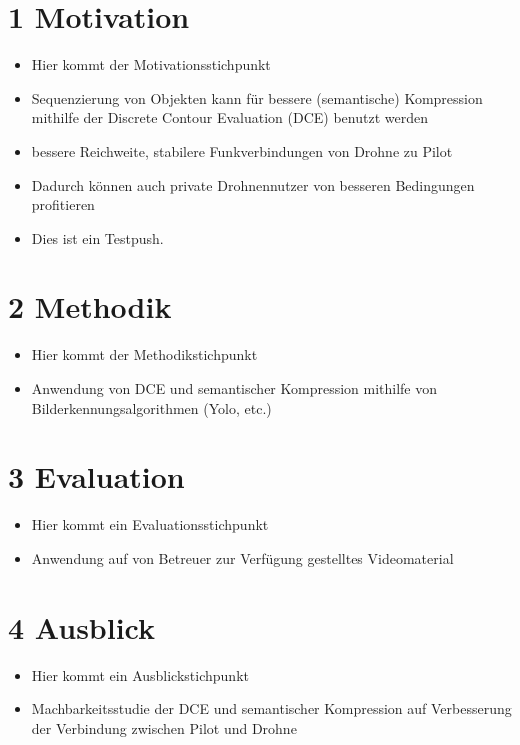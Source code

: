 \documentclass[a4paper,11pt,pdftex]{scrreport}
\begin{document}
\section*{1 Motivation}
\begin{itemize}
    \item Hier kommt der Motivationsstichpunkt
    \item Sequenzierung von Objekten kann für bessere (semantische) Kompression mithilfe der Discrete Contour Evaluation (DCE) benutzt werden
    \item bessere Reichweite, stabilere Funkverbindungen von Drohne zu Pilot
    \item Dadurch können auch private Drohnennutzer von besseren Bedingungen profitieren
    \item Dies ist ein Testpush.
\end{itemize}


\section*{2 Methodik}
\begin{itemize}
    \item Hier kommt der Methodikstichpunkt
    \item Anwendung von DCE und semantischer Kompression mithilfe von Bilderkennungsalgorithmen (Yolo, etc.)
    

\end{itemize}



\section*{3 Evaluation}
\begin{itemize}
    \item Hier kommt ein Evaluationsstichpunkt
    \item Anwendung auf von Betreuer zur Verfügung gestelltes Videomaterial
\end{itemize}


\section*{4 Ausblick}
\begin{itemize}
    \item Hier kommt ein Ausblickstichpunkt
    \item Machbarkeitsstudie der DCE und semantischer Kompression auf Verbesserung der Verbindung zwischen Pilot und Drohne
\end{itemize}

\appendix

 


\setcounter{page}{1}
\end{document}
